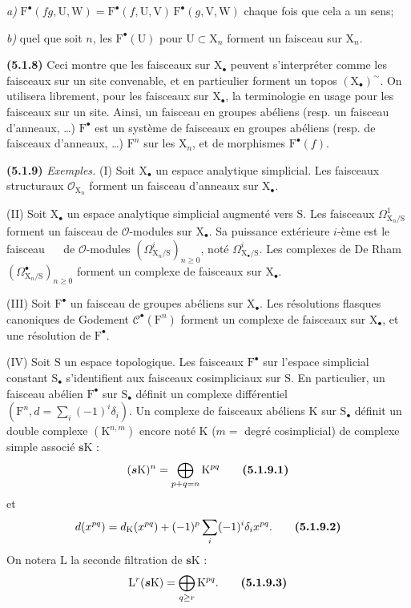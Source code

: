 \documentclass[11pt,leqno]{article}
\newcommand{\Page}[1]{\ifvmode\noindent\else\unskip\ \fi{\footnotesize\textcolor{gray}{[p.\,#1]}}\ \ignorespaces}
\begin{document}
\noindent\textit{a)} \(\mathrm{F}^{\bullet}(fg,\mathrm{U},\mathrm{W})=\mathrm{F}^{\bullet}(f,\mathrm{U},\mathrm{V})\,\mathrm{F}^{\bullet}(g,\mathrm{V},\mathrm{W})\) chaque fois que cela a un sens;\par
\noindent\textit{b)} quel que soit \(n\), les \(\mathrm{F}^{\bullet}(\mathrm{U})\) pour \(\mathrm{U}\subset\mathrm{X}_n\) forment un faisceau sur \(\mathrm{X}_n\).\par

\textbf{(5.1.8)} Ceci montre que les faisceaux sur \(\mathrm{X}_{\bullet}\) peuvent s’interpréter comme les faisceaux sur un site convenable, et en particulier forment un topos \((\mathrm{X}_{\bullet})^{\sim}\). On utilisera librement, pour les faisceaux sur \(\mathrm{X}_{\bullet}\), la terminologie en usage pour les faisceaux sur un site. Ainsi, un faisceau en groupes abéliens (resp. un faisceau d’anneaux, …) \(\mathrm{F}^{\bullet}\) est un système de faisceaux en groupes abéliens (resp. de faisceaux d’anneaux, …) \(\mathrm{F}^n\) sur les \(\mathrm{X}_n\), et de morphismes \(\mathrm{F}^{\bullet}(f)\).

\textbf{(5.1.9)} \textit{Exemples.} (I) Soit \(\mathrm{X}_{\bullet}\) un espace analytique simplicial. Les faisceaux structuraux \(\mathscr{O}_{\mathrm{X}_n}\) forment un faisceau d’anneaux sur \(\mathrm{X}_{\bullet}\).

(II) Soit \(\mathrm{X}_{\bullet}\) un espace analytique simplicial augmenté vers \(\mathrm{S}\). Les faisceaux \(\Omega^1_{\mathrm{X}_n/\mathrm{S}}\) forment un faisceau de \(\mathscr{O}\)-modules sur \(\mathrm{X}_{\bullet}\). Sa puissance extérieure \(i\)-ème est le faisceau
\Page{11}
de \(\mathscr{O}\)-modules \((\Omega^i_{\mathrm{X}_n/\mathrm{S}})_{n\geq0}\), noté \(\Omega^i_{\mathrm{X}_{\bullet}/\mathrm{S}}\). Les complexes de De Rham \((\Omega^{\bullet}_{\mathrm{X}_n/\mathrm{S}})_{n\geq0}\) forment un complexe de faisceaux sur \(\mathrm{X}_{\bullet}\).

(III) Soit \(\mathrm{F}^{\bullet}\) un faisceau de groupes abéliens sur \(\mathrm{X}_{\bullet}\). Les résolutions flasques canoniques de Godement \(\mathscr{C}^{\bullet}(\mathrm{F}^n)\) forment un complexe de faisceaux sur \(\mathrm{X}_{\bullet}\), et une résolution de \(\mathrm{F}^{\bullet}\).

(IV) Soit \(\mathrm{S}\) un espace topologique. Les faisceaux \(\mathrm{F}^{\bullet}\) sur l’espace simplicial constant \(\mathrm{S}_{\bullet}\) s’identifient aux faisceaux cosimpliciaux sur \(\mathrm{S}\). En particulier, un faisceau abélien \(\mathrm{F}^{\bullet}\) sur \(\mathrm{S}_{\bullet}\) définit un complexe différentiel \((\mathrm{F}^n,d=\sum\limits_i(-1)^i\delta_i)\). Un complexe de faisceaux abéliens \(\mathrm{K}\) sur \(\mathrm{S}_{\bullet}\) définit un double complexe \((\mathrm{K}^{n,m})\) encore noté \(\mathrm{K}\) (\(m=\) degré cosimplicial) de complexe simple associé \(\boldsymbol{s}\mathrm{K}\) :
\[
(\boldsymbol{s}\mathrm{K})^n
=\bigoplus_{p+q=n}\mathrm{K}^{pq}
\tag*{\textbf{(5.1.9.1)}}
\]
et
\[
d(x^{pq})=d_{\mathrm{K}}(x^{pq})
+(-1)^p\sum_i(-1)^i\delta_i x^{pq}.
\tag*{\textbf{(5.1.9.2)}}
\]
On notera \(\mathrm{L}\) la seconde filtration de \(\boldsymbol{s}\mathrm{K}\) :
\[
\mathrm{L}^r(\boldsymbol{s}\mathrm{K})
=\bigoplus_{q\geq r}\mathrm{K}^{pq}.
\tag*{\textbf{(5.1.9.3)}}
\]
\end{document}
